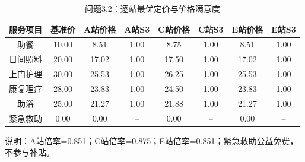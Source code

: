\begin{table}[h]
\centering
\caption{问题3.2：逐站最优定价与价格满意度}
\begin{tabular}{|c|c|cc|cc|cc|}
\hline
服务项目 & 基准价 & A站价格 & A站S3 & C站价格 & C站S3 & E站价格 & E站S3 \\
\hline
助餐 & 10.00 & 8.51 & 1.00 & 8.75 & 1.00 & 8.51 & 1.00 \\
日间照料 & 20.00 & 17.02 & 1.00 & 17.50 & 1.00 & 17.02 & 1.00 \\
上门护理 & 30.00 & 25.53 & 1.00 & 26.25 & 1.00 & 25.53 & 1.00 \\
康复理疗 & 28.00 & 23.83 & 1.00 & 24.50 & 1.00 & 23.83 & 1.00 \\
助浴 & 25.00 & 21.27 & 1.00 & 21.88 & 1.00 & 21.27 & 1.00 \\
紧急救助 & 0.00 & 0.00 & -- & 0.00 & -- & 0.00 & -- \\
\hline
\end{tabular}
\vspace{0.2cm}
说明：A站倍率=0.851；C站倍率=0.875；E站倍率=0.851；紧急救助公益免费，不参与补贴。
\end{table}